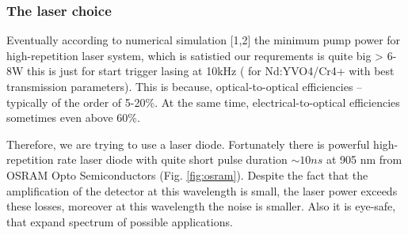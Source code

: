 \subsubsection{The laser choice}
Eventually according to numerical simulation [1,2] the minimum pump power for high-repetition laser system, which is satistied our requrements is quite big > 6-8W this is just for start trigger lasing at 10kHz ( for Nd:YVO4/Cr4+ with best transmission parameters). This is because, optical-to-optical efficiencies – typically of the order of 5-20\%.
At the same time, electrical-to-optical efficiencies sometimes even above 60\%.

Therefore, we are trying to use a laser diode. Fortunately there is powerful high-repetition rate laser diode with quite short pulse duration $\sim 10ns$ at 905 nm from OSRAM Opto Semiconductors (Fig. \ref{fig:osram}).
Despite the fact that the amplification of the detector at this wavelength is small,
the laser power exceeds these losses, moreover at this wavelength the noise is smaller. 
Also it is eye-safe, that expand spectrum of possible applications.

\begin{figure}
\begin{floatrow}
\end{floatrow}
\end{figure}





